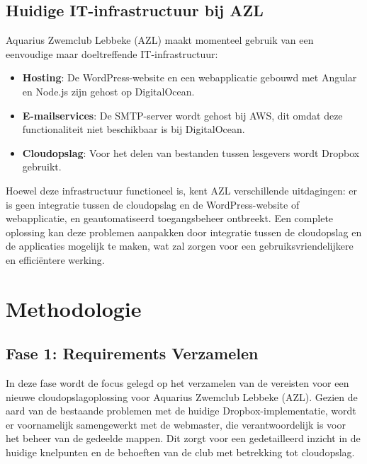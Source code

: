 \subsection{Huidige IT-infrastructuur bij AZL}
Aquarius Zwemclub Lebbeke (AZL) maakt momenteel gebruik van een eenvoudige maar doeltreffende IT-infrastructuur:
\begin{itemize}
    \item \textbf{Hosting}: De WordPress-website en een webapplicatie gebouwd met Angular en Node.js zijn gehost op DigitalOcean.
    \item \textbf{E-mailservices}: De SMTP-server wordt gehost bij AWS, dit omdat deze functionaliteit niet beschikbaar is bij DigitalOcean.
    \item \textbf{Cloudopslag}: Voor het delen van bestanden tussen lesgevers wordt Dropbox gebruikt.
\end{itemize}
Hoewel deze infrastructuur functioneel is, kent AZL verschillende uitdagingen: er is geen integratie tussen de cloudopslag en de 
WordPress-website of webapplicatie, en geautomatiseerd toegangsbeheer ontbreekt. Een complete oplossing kan deze problemen aanpakken 
door integratie tussen de cloudopslag en de applicaties mogelijk te maken, wat zal zorgen voor een gebruiksvriendelijkere en efficiëntere werking.

\section{Methodologie}%
\label{sec:methodologie}

\subsection{Fase 1: Requirements Verzamelen}
In deze fase wordt de focus gelegd op het verzamelen van de vereisten voor een nieuwe cloudopslagoplossing voor Aquarius Zwemclub Lebbeke (AZL). Gezien de aard van de bestaande problemen met de huidige Dropbox-implementatie, wordt er voornamelijk samengewerkt met de webmaster, die verantwoordelijk is voor het beheer van de gedeelde mappen. Dit zorgt voor een gedetailleerd inzicht in de huidige knelpunten en de behoeften van de club met betrekking tot cloudopslag.

